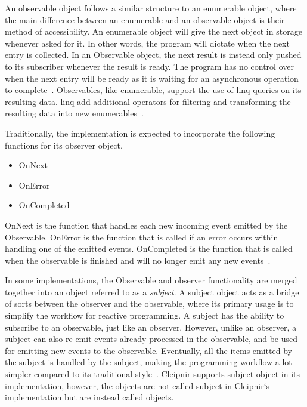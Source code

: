 An observable object follows a similar structure to an enumerable object, where the main difference between an enumerable and an observable object is their method of accessibility. An enumerable object will give the next object in storage whenever asked for it. In other words, the program will dictate when the next entry is collected. In an Observable object, the next result is instead only pushed to its subscriber whenever the result is ready. The program has no control over when the next entry will be ready as it is waiting for an asynchronous operation to complete~\cites{WEB:ReactiveObservable, VIDEO:dotnetsheffReactive, VIDEO:MicroDev}[p.~15]{BOOK:RxLinq}. Observables, like enumerable, support the use of \ac{linq} queries on its resulting data. \ac{linq} add additional operators for filtering and transforming the resulting data into new enumerables~\cites{VIDEO:dotnetsheffReactive}[p.~3-4]{BOOK:RxLinq}[p.~208]{BOOK:DotnetMultithreadCookBook}.

Traditionally, the implementation is expected to incorporate the following functions for its observer object.
\begin{itemize}
	\item{OnNext}
	\item{OnError}
	\item{OnCompleted}
\end{itemize}

OnNext is the function that handles each new incoming event emitted by the Observable. OnError is the function that is called if an error occurs within handling one of the emitted events. OnCompleted is the function that is called when the observable is finished and will no longer emit any new events~\cite{WEB:ReactiveObservable}.

In some implementations, the Observable and observer functionality are merged together into an object referred to as a \emph{subject}. A subject object acts as a bridge of sorts between the observer and the observable, where its primary usage is to simplify the workflow for reactive programming. A subject has the ability to subscribe to an observable, just like an observer. However, unlike an observer, a subject can also re-emit events already processed in the observable, and be used for emitting new events to the observable. Eventually, all the items emitted by the subject is handled by the subject, making the programming workflow a lot simpler compared to its traditional style~\cite{WEB:ReactiveSubject}. Cleipnir supports subject object in its implementation, however, the objects are not called subject in Cleipnir`s implementation but are instead called  objects.
